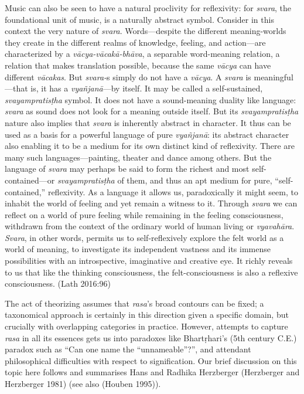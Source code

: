 \begin{myquote}
Music can also be seen to have a natural proclivity for reflexivity: for \textsl{svara}, the foundational unit of music, is a naturally abstract symbol. Consider in this context the very nature of \textsl{svara}. Words—despite the different meaning-worlds they create in the different realms of knowledge, feeling, and action—are characterized by a \textsl{vācya-vācakā-bhāva}, a separable word-meaning relation, a relation that makes translation possible, because the same \textsl{vācya} can have different \textsl{vācakas}. But \textsl{svara-}s simply do not have a \textsl{vācya}. A \textsl{svara} is meaningful—that is, it has a \textsl{vyañjanā}---by itself. It may be called a self-sustained, \textsl{svayampratisṭha} symbol. It does not have a sound-meaning duality like language: \textsl{svara} as sound does not look for a meaning outside itself. But its \textsl{svayampratisṭha} nature also implies that \textsl{svara} is inherently abstract in character. It thus can be used as a basis for a powerful language of pure \textsl{vyañjanā}: its abstract character also enabling it to be a medium for its own distinct kind of reflexivity. There are many such languages—painting, theater and dance among others. But the language of \textsl{svara} may perhaps be said to form the richest and most self-contained—or \textsl{svayampratisṭha} of them, and thus an apt medium for pure, “self-contained,” reflexivity. As a language it allows us, paradoxically it might seem, to inhabit the world of feeling and yet remain a witness to it. Through \textsl{svara} we can reflect on a world of pure feeling while remaining in the feeling consciousness, withdrawn from the context of the ordinary world of human living or \textsl{vyavahāra}. \textsl{Svara}, in other words, permits us to self-reflexively explore the felt world as a world of meaning, to investigate its independent vastness and its immense possibilities with an introspective, imaginative and creative eye. It richly reveals to us that like the thinking consciousness, the felt-consciousness is also a reflexive consciousness. 
\hfill(Lath 2016:96)
\end{myquote}

The act of theorizing assumes that \textsl{rasa}’s broad contours can be fixed; a taxonomical approach is certainly in this direction given a specific domain, but crucially with overlapping categories in practice. However, attempts to capture \textsl{rasa} in all its essences gets us into paradoxes like Bhartṛhari's (5th century C.E.) paradox such as “Can one name the “unnameable”?”, and attendant philosophical difficulties with respect to signification. Our brief discussion on this topic here follows and summarises Hans and Radhika Herzberger (Herzberger and Herzberger 1981) (see also (Houben 1995)).

